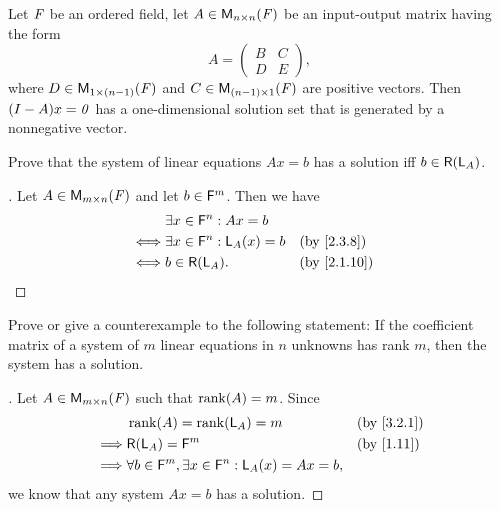 \begin{thm}\label{3.12}
  Let \(\mathit{F}\) be an ordered field, let \(A \in \mathsf{M}_{{n} \times n}({\mathit{F}})\) be an input-output matrix having the form
  \[
    A = \begin{pmatrix}
      B & C \\
      D & E
    \end{pmatrix},
  \]
  where \(D \in \mathsf{M}_{{1} \times (n - 1)}({\mathit{F}})\) and \(C \in \mathsf{M}_{{(n - 1)} \times 1}({\mathit{F}})\) are positive vectors.
  Then \((I - A)x = \mathit{0}\) has a one-dimensional solution set that is generated by a nonnegative vector.
\end{thm}

\exercisesection

\setcounter{ex}{8}
\begin{ex}\label{ex:3.3.9}
  Prove that the system of linear equations \(Ax = b\) has a solution iff \(b \in \rg{\L_A}\).
\end{ex}

\begin{proof}[]
  Let \(A \in \mathsf{M}_{{m} \times n}({\mathit{F}})\) and let \(b \in \mathsf{F}^m\).
  Then we have
  \begin{align*}
         & \exists x \in \vs{F}^n : Ax = b                                     \\
    \iff & \exists x \in \vs{F}^n : \L_A(x) = b &  & \text{(by \cref{2.3.8})}  \\
    \iff & b \in \rg{\L_A}.                     &  & \text{(by \cref{2.1.10})}
  \end{align*}
\end{proof}

\begin{ex}\label{ex:3.3.10}
  Prove or give a counterexample to the following statement:
  If the coefficient matrix of a system of \(m\) linear equations in \(n\) unknowns has rank \(m\), then the system has a solution.
\end{ex}

\begin{proof}[]
  Let \(A \in \mathsf{M}_{{m} \times n}({\mathit{F}})\) such that \(\rk{A} = m\).
  Since
  \begin{align*}
             & \rk{A} = \rk{\L_A} = m                                             &  & \text{(by \cref{3.2.1})} \\
    \implies & \rg{\L_A} = \vs{F}^m                                               &  & \text{(by \cref{1.11})}  \\
    \implies & \forall b \in \vs{F}^m, \exists x \in \vs{F}^n : \L_A(x) = Ax = b,
  \end{align*}
  we know that any system \(Ax = b\) has a solution.
\end{proof}
